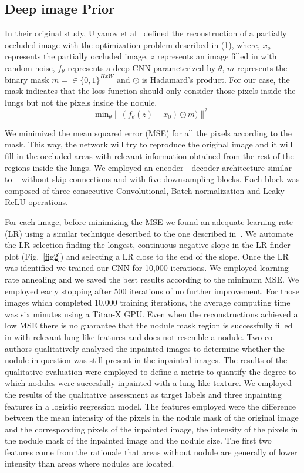 \documentclass[runningheads]{llncs}
\begin{document}
\subsection{Deep image Prior}
In their original study, Ulyanov et al~\cite{DBLP:journals/corr/abs-1711-10925} defined the reconstruction of a partially occluded image with the optimization problem described in (1), where, \(x_o\) represents the partially occluded image, \(z\) represents an image filled in with random noise, \(f_\theta\) represents a deep CNN parameterized by \(\theta\), \(m\) represents the binary mask \(m = \in \{0, 1\}^{HxW} \) and \(\odot\) is Hadamard's product. For our case, the mask indicates that the loss function should only consider those pixels inside the lungs but not the pixels inside the nodule. 
\begin{equation}
\textrm{min}_\theta  \|(f_\theta(z) - x_0) \odot m) \|^2
\end{equation}

 We minimized the mean squared error (MSE) for all the pixels according to the mask. This way, the network will try to reproduce the original image and it will fill in the occluded areas with relevant information obtained from the rest of the regions inside the lungs. We employed an encoder - decoder architecture similar to ~\cite{DBLP:journals/corr/abs-1711-10925} without skip connections and with five downsampling blocks. Each block was composed of three consecutive Convolutional, Batch-normalization and Leaky ReLU operations.

For each image, before minimizing the MSE we found an adequate learning rate (LR) using a similar technique described to the one described in~\cite{DBLP:journals/corr/Smith15a}. We automate the LR selection finding the longest, continuous negative slope in the LR finder plot (Fig.~\ref{fig2}) and selecting a LR close to the end of the slope.  Once the LR was identified we trained our CNN for 10,000 iterations. We employed learning rate annealing and we saved the best results according to the minimum MSE. We employed early stopping after 500 iterations of no further improvement. For those images which completed 10,000 training iterations, the average computing time was six minutes using a Titan-X GPU. Even when the reconstructions achieved a low MSE there is no guarantee that the nodule mask region is successfully filled in with relevant lung-like features and does not resemble a nodule. Two co-authors qualitatively analyzed the inpainted images to determine whether the nodule in question was still present in the inpainted images. The results of the qualitative evaluation were employed to define a metric to quantify the degree to which nodules were succesfully inpainted with a lung-like texture. We employed the results of the qualitative assessment as target labels and three inpainting features in a logistic regression model. The features employed were the difference between the mean intensity of the pixels in the nodule mask of the original image and the corresponding pixels of the inpainted image, the intensity of the pixels in the nodule mask of the inpainted image and the nodule size. The first two features come from the rationale that areas without nodule are generally of lower intensity than areas where nodules are located.
\end{document}
